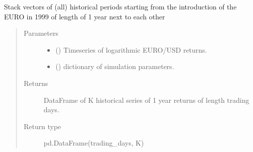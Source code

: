 \documentclass[a4paper,11pt,english]{sphinxmanual}
\begin{document}

\begin{fulllineitems}
\label{\detokenize{simulation:src.simulation.task_simulate_sample.generate_historical_returns}}
\sphinxAtStartPar
Stack vectors of (all) historical periods starting
from the introduction of the EURO in 1999 of length
of 1 year next to each other
\begin{quote}\begin{description}
\item[{Parameters}] \leavevmode\begin{itemize}
\item {} 
\sphinxAtStartPar
{} (\sphinxstyleliteralemphasis{\sphinxupquote{(}}\sphinxstyleliteralemphasis{\sphinxupquote{,}}\sphinxstyleliteralemphasis{\sphinxupquote{)}}) \textendash{} Timeseries of logarithmic EURO/USD returns.

\item {} 
\sphinxAtStartPar
{} () \textendash{} dictionary of simulation parameters.

\end{itemize}

\item[{Returns}] \leavevmode
\sphinxAtStartPar
DataFrame of K historical series of
1 year returns of length trading days.

\item[{Return type}] \leavevmode
\sphinxAtStartPar
pd.DataFrame(trading\_days, K)

\end{description}\end{quote}

\end{fulllineitems}
\end{document}
